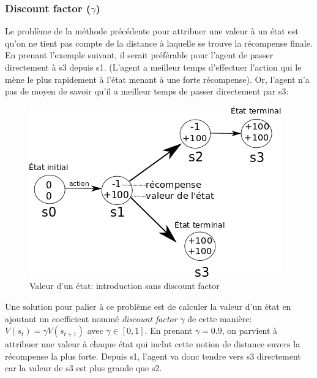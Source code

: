\documentclass[11pt,a4paper]{report}
\begin{document}
\subsubsection{Discount factor ($\gamma$)}
  
    \par Le problème de la méthode précédente pour attribuer une valeur à un état est qu'on ne tient pas compte de la distance à laquelle se trouve la récompense finale.\\
    En prenant l'exemple suivant, il serait préférable pour l'agent de passer directement à s3 depuis s1. (L'agent a meilleur temps d'effectuer l'action qui le mène le plus rapidement à l'état menant à une forte récompense). Or, l'agent n'a pas de moyen de savoir qu'il a meilleur temps de passer directement par s3:
    
    \begin{figure}[!h]
    \center
    \includegraphics[scale=0.60]{ressources/introduction_function_value_3.png}
    \caption{Valeur d'un état: introduction sans discount factor}
    \end{figure}
    
    \par Une solution pour palier à ce problème est de calculer la valeur d'un état en ajoutant un coefficient nommé \textit{discount factor} $\gamma$ de cette manière: $V(s_t) = \gamma V(s_{t+1})$ avec $\gamma \in [0,1]$. En prenant $\gamma = 0.9$, on parvient à attribuer une valeur à chaque état qui inclut cette notion de distance envers la récompense la plus forte. Depuis s1, l'agent va donc tendre vers s3 directement car la valeur de s3 est plus grande que s2.
    
\end{document}
